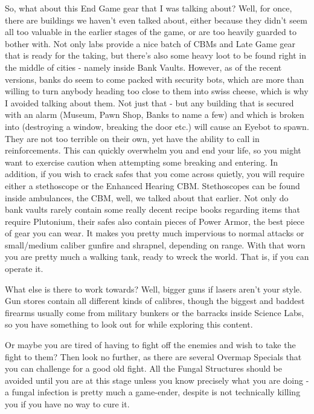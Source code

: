 \documentclass[11pt]{report}
\begin{document}
So, what about this End Game gear that I was talking about? Well, for once, there are buildings we haven't even talked about, either because they didn't seem all too valuable in the earlier stages of the game, or are too heavily guarded to bother with.
Not only labs provide a nice batch of CBMs and Late Game gear that is ready for the taking, but there's also some heavy loot to be found right in the middle of cities - namely inside Bank Vaults.
However, as of the recent versions, banks do seem to come packed with security bots, which are more than willing to turn anybody heading too close to them into swiss cheese, which is why I avoided talking about them. Not just that - but any building that is secured with an alarm (Museum, Pawn Shop, Banks to name a few) and which is broken into (destroying a window, breaking the door etc.) will cause an Eyebot to spawn. They are not too terrible on their own, yet have the ability to call in reinforcements. This can quickly overwhelm you and end your life, so you might want to exercise caution when attempting some breaking and entering.
In addition, if you wish to crack safes that you come across quietly, you will require either a stethoscope or the Enhanced Hearing CBM. Stethoscopes can be found inside ambulances, the CBM, well, we talked about that earlier. Not only do bank vaults rarely contain some really decent recipe books regarding items that require Plutonium, their safes also contain pieces of Power Armor, the best piece of gear you can wear. It makes you pretty much impervious to normal attacks or small/medium caliber gunfire and shrapnel, depending on range. With that worn you are pretty much a walking tank, ready to wreck the world. That is, if you can operate it.

What else is there to work towards? Well, bigger guns if lasers aren't your style. Gun stores contain all different kinds of calibres, though the biggest and baddest firearms usually come from military bunkers or the barracks inside Science Labs, so you have something to look out for while exploring this content.

Or maybe you are tired of having to fight off the enemies and wish to take the fight to them? Then look no further, as there are several Overmap Specials that you can challenge for a good old fight. All the Fungal Structures should be avoided until you are at this stage unless you know precisely what you are doing - a fungal infection is pretty much a game-ender, despite is not technically killing you if you have no way to cure it.
\end{document}
